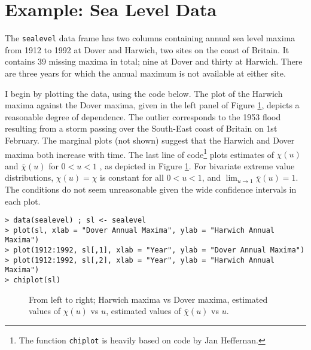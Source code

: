 \documentclass[11pt,a4paper]{article}
\begin{document}
\section{Example: Sea Level Data}
\setcounter{footnote}{0}
\label{egsealevel}

The \verb+sealevel+ data frame \citep{coletawn90} has two columns containing annual sea level maxima from 1912 to 1992 at Dover and Harwich, two sites on the coast of Britain. 
It contains 39 missing maxima in total; nine at Dover and thirty at Harwich.
There are three years for which the annual maximum is not available at either site.

I begin by plotting the data, using the code below. 
The plot of the Harwich maxima against the Dover maxima, given in the left panel of Figure \ref{seadata}, depicts a reasonable degree of dependence.
The outlier corresponds to the 1953 flood resulting from a storm passing over the South-East coast of Britain on 1st February.
The marginal plots (not shown) suggest that the Harwich and Dover maxima both increase with time. The last line of code\footnote{The function \texttt{chiplot} is heavily based on code by Jan Heffernan.} plots estimates of $\chi(u)$ and $\bar{\chi}(u)$ for $0 < u < 1$ \citep{coleheff99}, as depicted in Figure \ref{seadata}. For bivariate extreme value distributions, $\chi(u) = \chi$ is constant for all $0 < u < 1$, and $\lim_{u \rightarrow 1}\bar{\chi}(u) = 1$. The conditions do not seem unreasonable given the wide confidence intervals in each plot.   

\begin{verbatim}
> data(sealevel) ; sl <- sealevel
> plot(sl, xlab = "Dover Annual Maxima", ylab = "Harwich Annual Maxima")
> plot(1912:1992, sl[,1], xlab = "Year", ylab = "Dover Annual Maxima")
> plot(1912:1992, sl[,2], xlab = "Year", ylab = "Harwich Annual Maxima")
> chiplot(sl)
\end{verbatim}

\begin{figure}
\begin{center}
\vspace{-1.5cm}
\hspace{0cm}
\hspace{0cm}
\end{center} 
\caption{From left to right; Harwich maxima vs Dover maxima, estimated values of $\chi(u)$ vs $u$, estimated values of $\bar{\chi}(u)$ vs $u$.}
\label{seadata}
\end{figure}
\end{document}
